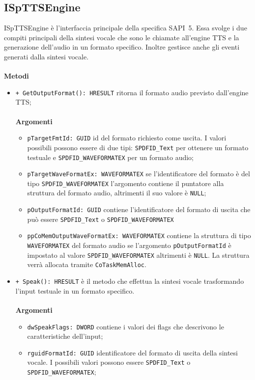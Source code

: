 \subsection{ISpTTSEngine}
ISpTTSEngine è l'interfaccia principale della specifica SAPI~5. Essa svolge i due compiti principali della sintesi vocale che sono le chiamate all'engine TTS e la generazione dell'audio in un formato specifico. Inoltre gestisce anche gli eventi generati dalla sintesi vocale.
\\\\
\textbf{Metodi}
\begin{itemize}
	\item \texttt{+ GetOutputFormat(): HRESULT} ritorna il formato audio previsto dall'engine TTS;
	\\\\
	\textbf{Argomenti}
	\begin{itemize}
		\item \texttt{pTargetFmtId: GUID} id del formato richiesto come uscita. I valori possibili possono essere di due tipi: \texttt{SPDFID\_Text} per ottenere un formato testuale e \texttt{SPDFID\_WAVEFORMATEX} per un formato audio;
		\item \texttt{pTargetWaveFormatEx: WAVEFORMATEX} se l'identificatore del formato è del tipo \texttt{SPDFID\_WAVEFORMATEX} l'argomento contiene il puntatore alla struttura del formato audio, altrimenti il suo valore è \texttt{NULL};
		\item \texttt{pOutputFormatId: GUID} contiene l'identificatore del formato di uscita che può essere \texttt{SPDFID\_Text} o \texttt{SPDFID\_WAVEFORMATEX}
		\item \texttt{ppCoMemOutputWaveFormatEx: WAVEFORMATEX} contiene la struttura di tipo \texttt{WAVEFORMATEX} del formato audio se l'argomento \texttt{pOutputFormatId} è impostato al valore \texttt{SPDFID\_WAVEFORMATEX} altrimenti è \texttt{NULL}. La struttura verrà allocata tramite \texttt{CoTaskMemAlloc}.
	\end{itemize}
	\item \texttt{+ Speak(): HRESULT} è il metodo che effettua la sintesi vocale trasformando l'input testuale in un formato specifico.
	\\\\
	\textbf{Argomenti}
	\begin{itemize}
		\item \texttt{dwSpeakFlags: DWORD} contiene i valori dei flags che descrivono le caratteristiche dell'input;
		\item \texttt{rguidFormatId: GUID} identificatore del formato di uscita della sintesi vocale. I possibili valori possono essere \texttt{SPDFID\_Text} o \texttt{SPDFID\_WAVEFORMATEX};

\end{itemize}
\end{itemize}
